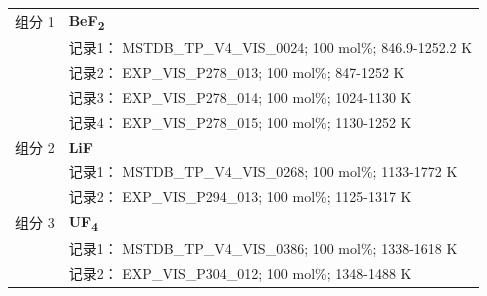 \documentclass[12pt]{article}
\begin{document}
{\begin{longtable}[]{@{}
  >{\raggedright\arraybackslash}p{}
  >{\raggedright\arraybackslash}p{}@{}}
组分 1  & \textbf{BeF\textsubscript{2}} \\
 & 记录1： MSTDB\_TP\_V4\_VIS\_0024; 100 mol\%; 846.9-1252.2 K \\
 & 记录2： EXP\_VIS\_P278\_013; 100 mol\%; 847-1252 K \\
 & 记录3： EXP\_VIS\_P278\_014; 100 mol\%; 1024-1130 K \\
 & 记录4： EXP\_VIS\_P278\_015; 100 mol\%; 1130-1252 K  \\

组分 2  & \textbf{LiF} \\
 & 记录1： MSTDB\_TP\_V4\_VIS\_0268; 100 mol\%; 1133-1772 K \\
 & 记录2： EXP\_VIS\_P294\_013; 100 mol\%; 1125-1317 K  \\

组分 3  & \textbf{UF\textsubscript{4}} \\
 & 记录1： MSTDB\_TP\_V4\_VIS\_0386; 100 mol\%; 1338-1618 K \\
 & 记录2： EXP\_VIS\_P304\_012; 100 mol\%; 1348-1488 K  \\


\end{longtable}}
\end{document}
